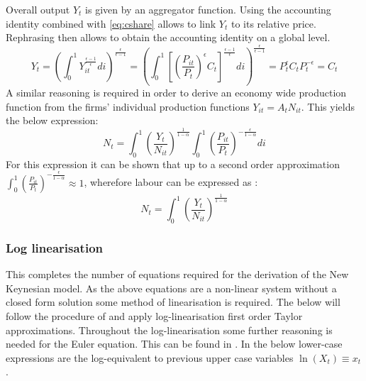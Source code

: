 \documentclass[12pt,a4paper,english]{article} %
\begin{document}
	Overall output $Y_t$ is given by an aggregator function. Using the accounting identity combined with \eqref{eq:cshare} allows to link $Y_t$ to its relative price. Rephrasing then allows to obtain the accounting identity on a global level. 	
	\begin{equation}
			Y_t = 
			\left( 
				\int_{0}^{1} Y_{it}^{\frac{\epsilon - 1}{\epsilon}} di 
			\right)^{\frac{\epsilon}{\epsilon - 1}}
			=
			\left( 
			\int_{0}^{1} 
			\left[
			\left( \frac{P_{it}}{P_t} \right)^\epsilon C_t
			\right]^{\frac{\epsilon - 1}{\epsilon}} di 
			\right)^{\frac{\epsilon}{\epsilon - 1}}
			=
			P_t^{\epsilon} C_t P_t^{-\epsilon}
			=
			C_t
	\end{equation}
	A similar reasoning is required in order to derive an economy wide production function from the firms' individual production functions $Y_{it} = A_t N_{it}$. This yields the below expression:
	\begin{equation}
		N_t = 	
		\int_{0}^{1} \left( \frac{Y_t}{N_{it}} \right)^{\frac{1}{1 - \alpha}}
		\int_{0}^{1} \left( \frac{P_{it}}{P_t} \right)^{-\frac{\epsilon}{1 - \alpha}} di
	\end{equation}
	For this expression it can be shown that up to a second order approximation $\int_{0}^{1} \left( \frac{P_{it}}{P_t} \right)^{-\frac{\epsilon}{1 - \alpha}} \approx 1$, wherefore labour can be expressed as \cite{gali_monetary_2008}:
	\begin{equation}\label{eq: Nt}
		N_t = \int_{0}^{1} \left( \frac{Y_t}{N_{it}} \right)^{\frac{1}{1 - \alpha}}
	\end{equation}
	
	\subsubsection{Log linearisation} \label{nk_log_lin}
	This completes the number of equations required for the derivation of the New Keynesian model. As the above equations are a non-linear system without a closed form solution some method of linearisation is required. The below will follow the procedure of \cite{gali_monetary_2008} and apply log-linearisation first order Taylor approximations. Throughout the log-linearisation some further reasoning is needed for the Euler equation. This can be found in . In the below lower-case expressions are the log-equivalent to previous upper case variables $\ln(X_t) \equiv x_t$.\\
		
\end{document}
